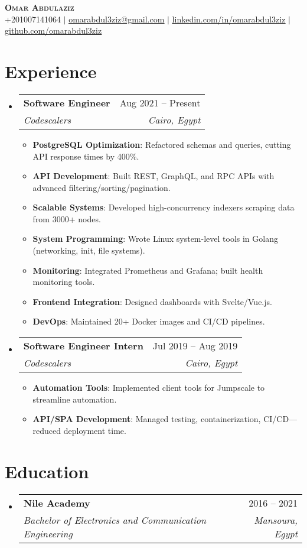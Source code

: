 \documentclass[a4paper,11pt]{article}
\makeatletter
\newcommand{\resumeSubheading}[4]{
  \item[]
    \begin{tabular*}{0.97\textwidth}[t]{l@{\extracolsep{\fill}}r}
      \textbf{#1} & #2 \\
      \textit{\small #3} & \textit{\small #4} \\
    \end{tabular*}\vspace{-7pt}
}
\newcommand{\resumeItem}[1]{\item \small{#1}}
\newcommand{\resumeListStart}{\begin{itemize}[leftmargin=0.15in,label=\textbullet]}
\newcommand{\resumeListEnd}{\end{itemize}\vspace{-5pt}}
\makeatother
\begin{document}
\begin{center}
    \textbf{\Huge \scshape Omar Abdulaziz} \\ \vspace{1pt}
    \small +201007141064 $|$ 
    \href{mailto:omarabdul3ziz@gmail.com}{\underline{omarabdul3ziz@gmail.com}} $|$ 
    \href{https://linkedin.com/in/omarabdul3ziz}{\underline{linkedin.com/in/omarabdul3ziz}} $|$
    \href{https://github.com/omarabdul3ziz}{\underline{github.com/omarabdul3ziz}}
\end{center}

\section{Experience}
\resumeListStart

  \resumeSubheading
    {Software Engineer}{Aug 2021 -- Present}
    {Codescalers}{Cairo, Egypt}
    \resumeListStart
      \resumeItem{\textbf{PostgreSQL Optimization}: Refactored schemas and queries, cutting API response times by 400\%.}
      \resumeItem{\textbf{API Development}: Built REST, GraphQL, and RPC APIs with advanced filtering/sorting/pagination.}
      \resumeItem{\textbf{Scalable Systems}: Developed high-concurrency indexers scraping data from 3000+ nodes.}
      \resumeItem{\textbf{System Programming}: Wrote Linux system-level tools in Golang (networking, init, file systems).}
      \resumeItem{\textbf{Monitoring}: Integrated Prometheus and Grafana; built health monitoring tools.}
      \resumeItem{\textbf{Frontend Integration}: Designed dashboards with Svelte/Vue.js.}
      \resumeItem{\textbf{DevOps}: Maintained 20+ Docker images and CI/CD pipelines.}
    \resumeListEnd

  \resumeSubheading
    {Software Engineer Intern}{Jul 2019 -- Aug 2019}
    {Codescalers}{Cairo, Egypt}
    \resumeListStart
      \resumeItem{\textbf{Automation Tools}: Implemented client tools for Jumpscale to streamline automation.}
      \resumeItem{\textbf{API/SPA Development}: Managed testing, containerization, CI/CD—reduced deployment time.}
    \resumeListEnd

\resumeListEnd

\section{Education}
\resumeListStart
  \resumeSubheading
    {Nile Academy}{2016 -- 2021}
    {Bachelor of Electronics and Communication Engineering}{Mansoura, Egypt}
\resumeListEnd
\end{document}
